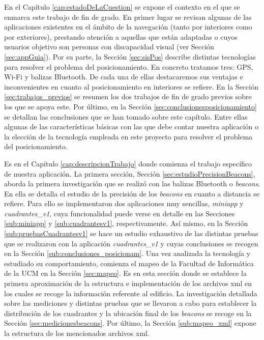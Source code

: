 En el Capítulo \ref{cap:estadoDeLaCuestion} se expone el contexto en el que se enmarca este trabajo de fin de grado. En primer lugar se revisan algunas de las aplicaciones existentes en el ámbito de la navegación (tanto por interiores como por exteriores), prestando atención a aquellas que están adaptadas o cuyos usuarios objetivo son personas con discapacidad visual (ver Sección \ref{sec:appGuia}). Por su parte, la Sección \ref{sec:sisPos} describe distintas tecnologías para resolver el problema del posicionamiento. En concreto tratamos tres: GPS, Wi-Fi y balizas Bluetooth. De cada una de ellas destacaremos sus ventajas e inconvenientes en cuanto al posicionamiento en interiores se refiere. En la Sección \ref{sec:trabajos_previos} se resumen los dos trabajos de fin de grado previos sobre los que se apoya este. Por último, en la Sección \ref{sec:conclusionesposicionamiento} se detallan las conclusiones que se han tomado sobre este capítulo. Entre ellas algunas de las características básicas con las que debe contar nuestra aplicación o la elección de la tecnología empleada en este proyecto para resolver el problema del posicionamiento. 

Es en el Capítulo \ref{cap:descripcionTrabajo} donde comienza el trabajo específico de nuestra aplicación. La primera sección, Sección \ref{sec:estudioPrecisionBeacons}, aborda la primera investigación que se realizó con las balizas Bluetooth o \textit{beacons}. En ella se detalla el estudio de la precisión de los \textit{beacons} en cuanto a distancia se refiere. Para ello se implementaron dos aplicaciones muy sencillas, \textit{miniapp} y \textit{cuadrantes\_v1}, cuya funcionalidad puede verse en detalle en las Secciones \ref{sub:miniapp} y \ref{sub:cuadrantesv1}, respectivamente. Así mismo, en la Sección \ref{sub:pruebasCuadrantesv1} se hace un estudio exhaustivo de las distintas pruebas que se realizaron con la aplicación \textit{cuadrantes\_v1} y cuyas conclusiones se recogen en la Sección \ref{sub:conclusiones_posicionam}. Una vez analizada la tecnología y estudiado su comportamiento, comienza el mapeo de la Facultad de Informática de la UCM en la Sección \ref{sec:mapeo}. Es en esta sección donde se establece la primera aproximación de la estructura e implementación de los archivos xml en los cuales se recoge la información referente al edificio. La investigación detallada sobre las mediciones y distintas pruebas que se llevaron a cabo para establecer la distribución de los cuadrantes y la ubicación final de los \textit{beacons} se recoge en la Sección \ref{sec:medicionesbeacons}. Por último, la Sección \ref{sub:mapeo_xml} expone la estructura de los mencionados archivos xml.

